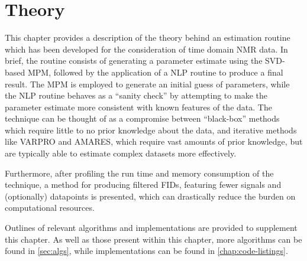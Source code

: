\chapter{Theory}
\label{chap:theory}

This chapter provides a description of the theory behind an estimation
routine which has been developed for the consideration of time domain \ac{NMR}
data.
In brief, the routine consists of generating a parameter estimate using the
\ac{SVD}-based \ac{MPM}, followed by the application of a \ac{NLP} routine to
produce a final result. The \ac{MPM} is employed to generate an initial
guess of parameters, while the \ac{NLP} routine behaves as a ``sanity
check'' by attempting to make the parameter estimate more consistent with
known features of the data. The technique can be thought of as a compromise
between ``black-box'' methods which require little to no prior knowledge about
the data, and iterative methods like \ac{VARPRO} and \ac{AMARES}, which require
vast amounts of prior knowledge, but are typically able to estimate
complex datasets more effectively.

Furthermore, after profiling the run time and memory consumption of the
technique, a method for producing filtered \acp{FID}, featuring fewer signals
and (optionally) datapoints is presented, which can drastically reduce the
burden on computational resources.

Outlines of relevant algorithms and \Python implementations are
provided to supplement this chapter. As well as those present
within this chapter, more algorithms can be found in \cref{sec:algs}, while
\Python implementations can be found in \cref{chap:code-listings}.







